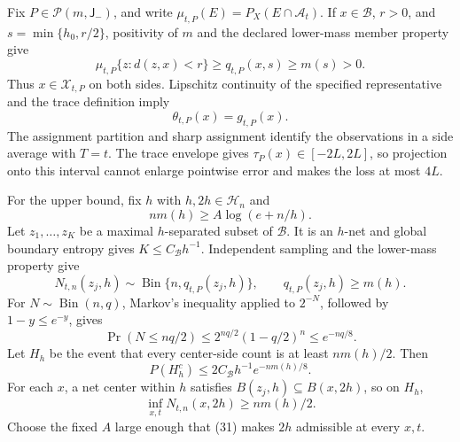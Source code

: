 Fix \(P\in\mathcal P(m,\mathsf J_-)\), and write \(\mu_{t,P}(E)=P_X(E\cap\mathcal A_t)\).  If \(x\in\mathcal B\), \(r>0\), and \(s=\min\{h_0,r/2\}\), positivity of \(m\) and the declared lower-mass member property give
\[
 \mu_{t,P}\{z:d(z,x)<r\}\ge q_{t,P}(x,s)\ge m(s)>0. \tag{29}
\]
Thus \(x\in\mathcal X_{t,P}\) on both sides.  Lipschitz continuity of the specified representative and the trace definition imply
\[
 \theta_{t,P}(x)=g_{t,P}(x). \tag{30}
\]
The assignment partition and sharp assignment identify the observations in a side average with \(T=t\).  The trace envelope gives \(\tau_P(x)\in[-2L,2L]\), so projection onto this interval cannot enlarge pointwise error and makes the loss at most \(4L\).

For the upper bound, fix \(h\) with \(h,2h\in\mathcal H_n\) and
\[
 nm(h)\ge A\log(e+n/h). \tag{31}
\]
Let \(z_1,\ldots,z_K\) be a maximal \(h\)-separated subset of \(\mathcal B\).  It is an \(h\)-net and global boundary entropy gives \(K\le C_{\mathcal B}h^{-1}\).  Independent sampling and the lower-mass property give
\[
 N_{t,n}(z_j,h)\sim\operatorname{Bin}\{n,q_{t,P}(z_j,h)\},
 \qquad q_{t,P}(z_j,h)\ge m(h). \tag{32}
\]
For \(N\sim\operatorname{Bin}(n,q)\), Markov's inequality applied to \(2^{-N}\), followed by \(1-y\le e^{-y}\), gives
\[
 \Pr(N\le nq/2)\le2^{nq/2}(1-q/2)^n\le e^{-nq/8}. \tag{33}
\]
Let \(H_h\) be the event that every center-side count is at least \(nm(h)/2\).  Then
\[
 P(H_h^c)\le2C_{\mathcal B}h^{-1}e^{-nm(h)/8}. \tag{34}
\]
For each \(x\), a net center within \(h\) satisfies \(B(z_j,h)\subseteq B(x,2h)\), so on \(H_h\),
\[
 \inf_{x,t}N_{t,n}(x,2h)\ge nm(h)/2. \tag{35}
\]
Choose the fixed \(A\) large enough that (31) makes \(2h\) admissible at every \(x,t\).

